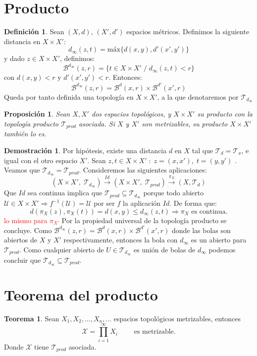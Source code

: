 \documentclass[12pt,twoside]{report}
\newcommand\mc[1]{\mathcal{#1}}
\theoremstyle{azul}
\theoremstyle{azul2}
\theoremstyle{plain}
\newtheorem*{prop}{Proposición}
\theoremstyle{definition}
\newtheorem*{defi}{Definición}
\newtheorem*{dem}{Demostración}
\newtheorem*{teo}{Teorema}
\theoremstyle{remark}
\begin{document}
\section{Producto}
\begin{defi}
Sean $(X,d),\,(X',d')$ espacios métricos. Definimos la siguiente distancia en $X \times X':$
$$ d_{\infty}(z,t)= \text{máx} \{d(x,y),d'(x',y')\}  $$
y dado $z \in X \times X'$, definimos:
$$\mc{B}^{d_\infty}(z,r) = \{ t \in X \times X' \; / \; d_{\infty}(z,t) < r \}$$
con $d(x,y)<r$ y $d'(x',y')<r$. Entonces:
$$\mc{B}^{d_\infty}(z,r)=\mc{B}^{d}(x,r) \times \mc{B}^{d'}(x',r)$$
Queda por tanto definida una topología en $X\times X'$, a la que denotaremos por $\mc{T}_{d_\infty}$
\end{defi}
\begin{prop}
Sean $X, X'$ dos espacios topológicos, y $X \times X'$ su producto con la topología producto $\mc{T}_{prod}$ asociada. Si $X$ y $X'$ son metrizables, su producto $X \times X'$ tambi{\'e}n lo es.
\end{prop}
\begin{dem}
Por hipótesis, existe una distancia $d$ en $X$ tal que $\mc{T}_d = \mc{T}_x$, e igual con el otro espacio $X'$. Sean $z,t \in X \times X' \; : \; z=(x,x'), \; t=(y,y')$
. 
Veamos que $\mc{T}_{d_\infty}= \mc{T}_{prod}$. Consideremos las siguientes aplicaciones:
$$(X \times X', \; \mc{T}_{d_\infty}) \stackrel{Id}{\longrightarrow} (X \times X', \; \mc{T}_{prod}) \stackrel{\pi_X}{\longrightarrow} (X,\mc{T}_d)$$
Que $Id$ sea continua implica que $\mc{T}_{prod} \subseteq \mc{T}_{d_\infty}$ porque todo abierto $\mc{U} \in X \times X' \Rightarrow f^{-1}(\mc{U}) = \mc{U}$ por ser $f$ la aplicación $Id$. De forma que:
$$d(\pi_X(z), \pi_{X}(t))= d(x,y) \leq d_{\infty}(z,t) \Rightarrow \pi_X \text{ es continua.}$$
\textcolor{red}{lo mismo para $\pi_{X'}$}
Por la propiedad universal de la topología producto se concluye.
Como $\mc{B}^{d_\infty}(z,r)=\mc{B}^{d}(x,r) \times \mc{B}^{d'}(x',r)$ donde las bolas son abiertos de $X$ y $X'$ respectivamente, entonces la bola con $d_{\infty}$ es un abierto para $\mc{T}_{prod}$. Como cualquier abierto de $U\in\mc{T}_{d_{\infty}}$ es unión de bolas de $d_{\infty}$ podemos concluir que $\mc{T}_{d_{\infty}} \subseteq \mc{T}_{prod}$.
\end{dem}
\section{Teorema del producto}
\begin{tcolorbox}
\begin{teo}
Sean $X_1, X_2, \ldots, X_n, \ldots $ espacios topológicos metrizables, entonces
$$\mc{X}=\prod_{i=1}^{\infty} X_i \qquad \text{ es metrizable.}$$
Donde $\mc{X}$ tiene $\mc{T}_{prod}$ asociada.
\end{teo}
\end{tcolorbox}
\end{document}
